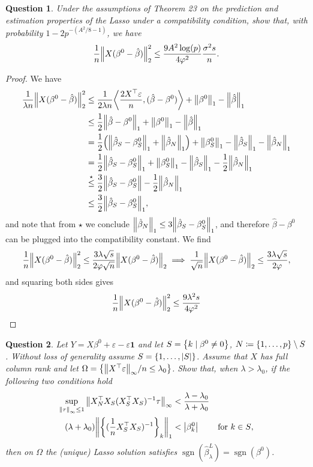 \documentclass{article}
\theoremstyle{plain}
\newtheorem{question}{Question}
\theoremstyle{remark}
\renewcommand{\vec}{\mathbf}
\renewcommand{\epsilon}{\varepsilon}
\renewcommand{\phi}{\varphi}
\DeclarePairedDelimiter{\ang}{\langle}{\rangle}
\newcommand{\T}{^\top} %
\newcommand\ceq\coloneqq %
\newcommand\eps\epsilon
\DeclareMathOperator{\sign}{sgn}
\begin{document}
\begin{question}
	Under the assumptions of Theorem 23 on the prediction and estimation properties of the Lasso under a compatibility condition, show that, with probability $1 - 2p^{-(A^2/8 - 1)}$, we have
	\[
	\frac1n \norm{X(\beta^0 - \hat\beta)}_2^2 \leq \frac{9A^2 \log(p)}{4\phi^2} \frac{\sigma^2 s}{n}. 
	\]
\end{question}
\begin{proof}
	We have 
	\begin{align*}
		\frac{1}{\lambda n} \norm{X(\beta^0 - \hat\beta)}_2^2 &\leq \frac{1}{2 \lambda n} \ang*{\frac{2X\T\eps}{n}, (\hat\beta - \beta^0)} + \norm{\beta^0}_1 - \norm{\hat\beta}_1 \\
		&\leq \frac12 \norm{\hat\beta - \beta^0}_1 + \norm{\beta^0}_1 - \norm{\hat\beta}_1 \\
		&= \frac12 \qty(\norm{\hat \beta_S - \beta^0_S}_1 + \norm{\hat\beta_N}_1) + \norm{\beta^0_S}_1 - \norm{\hat\beta_S}_1 - \norm{\hat\beta_N}_1 \\
		&= \frac12 \norm{\hat \beta_S - \beta^0_S}_1  + \norm{\beta^0_S}_1 - \norm{\hat\beta_S}_1 - \frac12 \norm{\hat\beta_N}_1 \\
		&\overset\star\leq \frac32 \norm{\hat\beta_S - \beta^0_S} - \frac12 \norm{\hat\beta_N}_1 \\
		&\leq \frac32 \norm{\hat\beta_S - \beta^0_S}_1,	\end{align*}
and note that from $\star$ we conclude $\norm{\hat\beta_N}_1 \leq 3 \norm{\hat\beta_S - \beta^0_S}_1$, and therefore $\hat\beta - \beta^0$ can be plugged into the compatibility constant. 
We find
\[
\frac1n \norm{X(\beta^0 -\hat\beta)}_2^2 \leq \frac{3\lambda \sqrt s}{2\phi \sqrt n} \norm{X(\beta^0 - \hat\beta)}_2 \implies \frac1{\sqrt n} \norm{X(\beta^0 - \hat\beta)}_2 \leq \frac{3\lambda \sqrt s}{2\phi },
\]
and squaring both sides gives
\[
\frac1n \norm{X(\beta^0 -\hat\beta)}_2^2 \leq \frac{9\lambda^2 s}{4\phi^2}
\]
\end{proof}

\begin{question}
Let $Y = X\beta^0 + \eps - \eps \vec 1$ and let $S = \qty{k \mid \beta^0 \neq 0}$, $N \ceq \qty{1, \dotsc, p} \setminus S$. Without loss of generality assume $S = \qty{1, \dotsc, \abs{S}}$. Assume that $X$ has full column rank and let $\Omega = \qty{\norm{X\T\eps}_\infty/n \leq \lambda_0}$. Show that, when $\lambda > \lambda_0$, if the following two conditions hold
\begin{align*}
	\sup_{\norm{\tau}_\infty \leq 1} \norm{X_N\T X_S (X_S\T X_S)^{-1} \tau}_\infty &< \frac{\lambda - \lambda_0}{\lambda + \lambda_0} \\
	(\lambda + \lambda_0) \norm{\qty{(\frac1n X_S\T X_S)^{-1}}_k}_1 &< \abs{\beta^0_k} &\text{for $k \in S$}, 
\end{align*}
then on $\Omega$ the (unique) Lasso solution satisfies $\sign(\hat\beta_\lambda^L) = \sign(\beta^0)$. 
\end{question}
\end{document}
